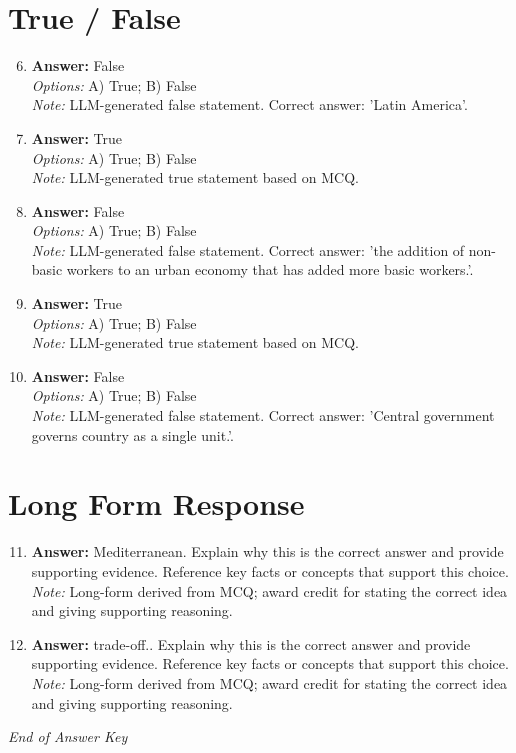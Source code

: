 \documentclass[12pt]{article}
\begin{document}
\section*{True / False}
\begin{enumerate}[label=\arabic*.]
\setcounter{enumi}{5}
\item \textbf{Answer:} False
\\ \textit{Options:} A) True; B) False
\\ \textit{Note:} LLM-generated false statement. Correct answer: 'Latin America'.
\item \textbf{Answer:} True
\\ \textit{Options:} A) True; B) False
\\ \textit{Note:} LLM-generated true statement based on MCQ.
\item \textbf{Answer:} False
\\ \textit{Options:} A) True; B) False
\\ \textit{Note:} LLM-generated false statement. Correct answer: 'the addition of non-basic workers to an urban economy that has added more basic workers.'.
\item \textbf{Answer:} True
\\ \textit{Options:} A) True; B) False
\\ \textit{Note:} LLM-generated true statement based on MCQ.
\item \textbf{Answer:} False
\\ \textit{Options:} A) True; B) False
\\ \textit{Note:} LLM-generated false statement. Correct answer: 'Central government governs country as a single unit.'.
\end{enumerate}

\section*{Long Form Response}
\begin{enumerate}[label=\arabic*.]
\setcounter{enumi}{10}
\item \textbf{Answer:} Mediterranean. Explain why this is the correct answer and provide supporting evidence. Reference key facts or concepts that support this choice.
\\ \textit{Note:} Long-form derived from MCQ; award credit for stating the correct idea and giving supporting reasoning.
\item \textbf{Answer:} trade-off.. Explain why this is the correct answer and provide supporting evidence. Reference key facts or concepts that support this choice.
\\ \textit{Note:} Long-form derived from MCQ; award credit for stating the correct idea and giving supporting reasoning.
\end{enumerate}

\vfill
\noindent\textit{End of Answer Key}
\end{document}
